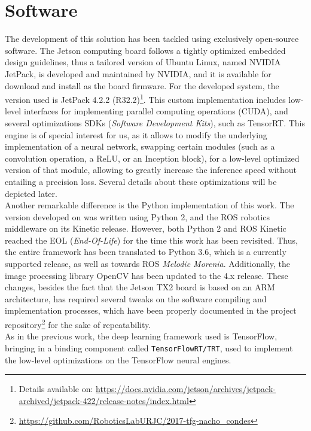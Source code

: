 \section{Software}

The development of this solution has been tackled using exclusively open-source software. The Jetson computing board follows a tightly optimized embedded design guidelines, thus a tailored version of Ubuntu Linux, named NVIDIA JetPack, is developed and maintained by NVIDIA, and it is available for download and install as the board firmware. For the developed system, the version used is JetPack 4.2.2 (R32.2)\footnote{Details available on: \url{https://docs.nvidia.com/jetson/archives/jetpack-archived/jetpack-422/release-notes/index.html}}. This custom implementation includes low-level interfaces for implementing parallel computing operations (CUDA), and several optimizations SDKs (\textit{Software Development Kits}), such as TensorRT. This engine is of special interest for us, as it allows to modify the underlying implementation of a neural network, swapping certain modules (such as a convolution operation, a ReLU, or an Inception block), for a low-level optimized version of that module, allowing to greatly increase the inference speed without entailing a precision loss. Several details about these optimizations will be depicted later.\\

Another remarkable difference is the Python implementation of this work. The version developed on \cite{tfg} was written using Python 2, and the ROS robotics middleware on its Kinetic release. However, both Python 2 and ROS Kinetic reached the EOL (\textit{End-Of-Life}) for the time this work has been revisited. Thus, the entire framework has been translated to Python 3.6, which is a currently supported release, as well as towards ROS \textit{Melodic Morenia}. Additionally, the image processing library OpenCV has been updated to the 4.x release. These changes, besides the fact that the Jetson TX2 board is based on an ARM architecture, has required several tweaks on the software compiling and implementation processes, which have been properly documented in the project repository\footnote{\url{https://github.com/RoboticsLabURJC/2017-tfg-nacho_condes}} for the sake of repeatability.\\

As in the previous work, the deep learning framework used is TensorFlow, bringing in a binding component called \texttt{TensorFlowRT/TRT}, used to implement the low-level optimizations on the TensorFlow neural engines.



